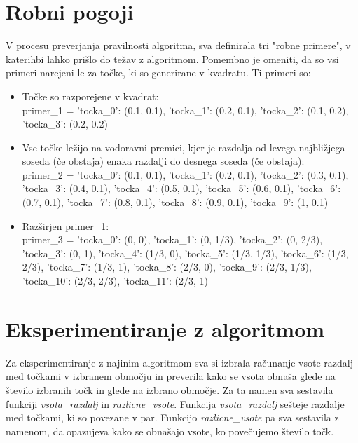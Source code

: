 \documentclass[12pt, a4paper]{article}
\begin{document}
\section{Robni pogoji}
V procesu preverjanja pravilnosti algoritma, sva definirala tri "robne primere", v katerihbi lahko prišlo do težav z algoritmom. Pomembno je omeniti, da so vsi primeri narejeni le za točke, ki so generirane v kvadratu. Ti primeri so:
\begin{itemize}
\item Točke so razporejene v kvadrat:\\

	primer_1 = {'tocka_0': (0.1, 0.1), 'tocka_1': (0.2, 0.1),  'tocka_2': (0.1,
	0.2),  'tocka_3': (0.2, 0.2)}


\item Vse točke ležijo na vodoravni premici, kjer je razdalja od levega najbližjega soseda (če obstaja) enaka razdalji do desnega soseda (če obstaja):\\

	    primer_2 = {'tocka_0': (0.1, 0.1), 'tocka_1': (0.2, 0.1), 'tocka_2': (0.3, 0.1),  'tocka_3': (0.4, 0.1),
           'tocka_4': (0.5, 0.1), 'tocka_5': (0.6, 0.1), 'tocka_6': (0.7, 0.1),  'tocka_7': (0.8, 0.1),
           'tocka_8': (0.9, 0.1), 'tocka_9': (1, 0.1)}

\item Razširjen primer_1:\\

	primer_3 = {'tocka_0': (0, 0), 'tocka_1': (0, 1/3), 'tocka_2': (0, 2/3),  'tocka_3': (0, 1),
           'tocka_4': (1/3, 0), 'tocka_5': (1/3, 1/3), 'tocka_6': (1/3, 2/3),  'tocka_7': (1/3, 1),
           'tocka_8': (2/3, 0), 'tocka_9': (2/3, 1/3), 'tocka_10': (2/3, 2/3),  'tocka_11': (2/3, 1)}

\end{itemize} 

\pagebreak
\section{Eksperimentiranje z algoritmom}
Za eksperimentiranje z najinim algoritmom sva si izbrala računanje vsote razdalj med točkami v izbranem območju in preverila kako se vsota obnaša glede na število izbranih točk in glede na izbrano območje. Za ta namen sva sestavila funkciji \textit{vsota_razdalj} in \textit{razlicne_vsote}. Funkcija  \textit{vsota_razdalj} sešteje razdalje med točkami, ki so povezane v par. Funkcijo \textit{razlicne_vsote} pa sva sestavila z namenom, da opazujeva kako se obnašajo vsote, ko povečujemo število točk. \\
\end{document}
